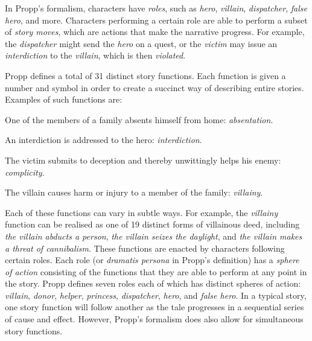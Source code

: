 \documentclass{llncs}
\begin{document}
In Propp's formalism, characters have \emph{roles}, such as \emph{hero}, \emph{villain}, \emph{dispatcher}, \emph{false hero}, and more. Characters performing a certain role are able to perform a subset of \emph{story moves}, which are actions that make the narrative progress. For example, the \emph{dispatcher} might send the \emph{hero} on a quest, or the \emph{victim} may issue an \emph{interdiction} to the \emph{villain}, which is then \emph{violated}.

Propp defines a total of 31 distinct story functions. Each function is given a number and symbol in order to create a succinct way of describing entire stories. Examples of such functions are:

\begin{compactitem}
  \item One of the members of a family absents himself from home: \emph{absentation}.
  \item An interdiction is addressed to the hero: \emph{interdiction}.
  \item The victim submits to deception and thereby unwittingly helps his enemy: \emph{complicity}.
  \item The villain causes harm or injury to a member of the family: \emph{villainy}.
\end{compactitem}

Each of these functions can vary in subtle ways. For example, the \emph{villainy} function can be realised as one of 19 distinct forms of villainous deed, including \emph{the villain abducts a person}, \emph{the villain seizes the daylight}, and \emph{the villain makes a threat of cannibalism}.
These functions are enacted by characters following certain roles. Each role (or \emph{dramatis persona} in Propp's definition) has a \emph{sphere of action} consisting of the functions that they are able to perform at any point in the story. Propp defines seven roles each of which has distinct spheres of action: \emph{villain}, \emph{donor}, \emph{helper}, \emph{princess}, \emph{dispatcher}, \emph{hero}, and \emph{false hero}.
In a typical story, one story function will follow another as the tale progresses in a sequential series of cause and effect. However, Propp's formalism does also allow for simultaneous story functions.
\end{document}
